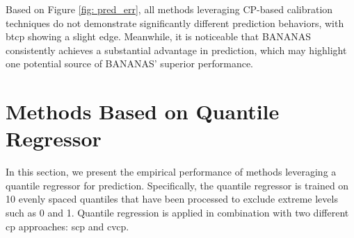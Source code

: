 \documentclass[a4paper,oneside,bibliography=totoc]{scrbook}
\begin{document}
\begin{description}[leftmargin=0cm, listparindent=\parindent]
		Based on Figure \ref{fig: pred_err}, all methods leveraging CP-based calibration techniques do not demonstrate significantly different prediction behaviors, with \gls{btcp} showing a slight edge. Meanwhile, it is noticeable that BANANAS consistently achieves a substantial advantage in prediction, which may highlight one potential source of BANANAS' superior performance.
		
\end{description} 

\section{Methods Based on Quantile Regressor}
In this section, we present the empirical performance of methods leveraging a quantile regressor for prediction. Specifically, the quantile regressor is trained on 10 evenly spaced quantiles that have been processed to exclude extreme levels such as 0 and 1. Quantile regression is applied in combination with two different \gls{cp} approaches: \gls{scp} and \gls{cvcp}.
\end{document}
